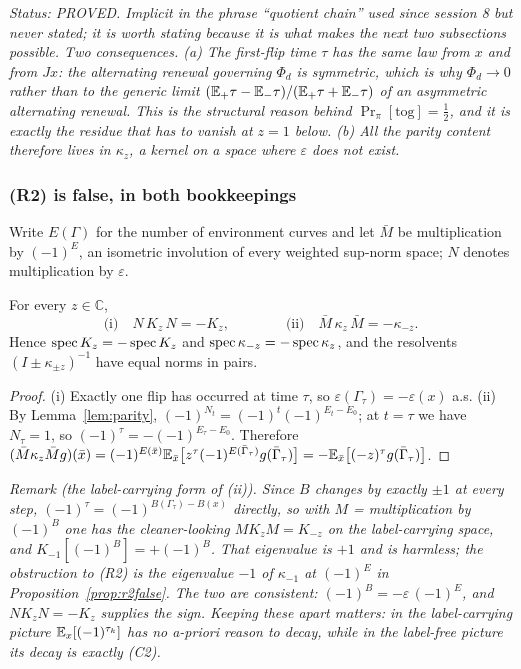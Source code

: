 \emph{Status: PROVED.  Implicit in the phrase ``quotient chain'' used
since session 8 but never stated; it is worth stating because it is
what makes the next two subsections possible.  Two consequences.  (a)
The first-flip time $\tau$ has the same law from $x$ and from $Jx$:
the alternating renewal governing $\Phi_d$ is \emph{symmetric}, which
is why $\Phi_d\to0$ rather than to the generic limit
$(\mathbb{E}_+\tau-\mathbb{E}_-\tau)/(\mathbb{E}_+\tau+\mathbb{E}_-\tau)$ of an asymmetric alternating
renewal.  This is the structural reason behind
$\Pr_\pi[\mathrm{tog}]=\tfrac12$, and it is exactly the residue that
has to vanish at $z=1$ below.  (b) All the parity content therefore
lives in $\kappa_z$, a kernel on a space where $\varepsilon$ does not
exist.}

\subsubsection{(R2) is false, in both bookkeepings}\label{sec:s11false}

Write $E(\Gamma)$ for the number of environment curves and let $\bar M$
be multiplication by $(-1)^{E}$, an isometric involution of every
weighted sup-norm space; $N$ denotes multiplication by $\varepsilon$.

\begin{lemma}\label{lem:conj}
For every $z\in\mathbb C$,
\[
\text{(i)}\quad N\,K_z\,N=-K_z,
\qquad\qquad
\text{(ii)}\quad \bar M\,\kappa_z\,\bar M=-\kappa_{-z} .
\]
Hence $\operatorname{spec} K_z=-\operatorname{spec} K_z$ and $\operatorname{spec}\kappa_{-z}=-\operatorname{spec}\kappa_z$, and
the resolvents $(I\pm\kappa_{\pm z})^{-1}$ have equal norms in pairs.
\end{lemma}

\begin{proof}
(i) Exactly one flip has occurred at time $\tau$, so
$\varepsilon(\Gamma_\tau)=-\varepsilon(x)$ a.s.
(ii) By Lemma~\ref{lem:parity}, $(-1)^{N_t}=(-1)^t(-1)^{E_t-E_0}$; at
$t=\tau$ we have $N_\tau=1$, so $(-1)^\tau=-(-1)^{E_\tau-E_0}$.
Therefore
$(\bar M\kappa_z\bar Mg)(\bar x)=(-1)^{E(\bar x)}
\mathbb{E}_{\bar x}\bigl[z^\tau(-1)^{E(\bar\Gamma_\tau)}g(\bar\Gamma_\tau)\bigr]
=-\mathbb{E}_{\bar x}\bigl[(-z)^\tau g(\bar\Gamma_\tau)\bigr]$.
\end{proof}

\emph{Remark (the label-carrying form of (ii)).  Since $B$ changes by
exactly $\pm1$ at every step, $(-1)^\tau=(-1)^{B(\Gamma_\tau)-B(x)}$
directly, so with $M$ = multiplication by $(-1)^{B}$ one has the
cleaner-looking $M K_zM=K_{-z}$ on the label-carrying space, and
$K_{-1}[(-1)^B]=+(-1)^B$.  That eigenvalue is $+1$ and is harmless;
the obstruction to (R2) is the eigenvalue $-1$ of
$\kappa_{-1}$ at $(-1)^E$ in Proposition~\ref{prop:r2false}.  The two
are consistent: $(-1)^B=-\varepsilon\,(-1)^E$, and
$N K_zN=-K_z$ supplies the sign.  Keeping these apart matters: in the
label-carrying picture $\mathbb{E}_x[(-1)^{\tau_k}]$ has no a-priori reason to
decay, while in the label-free picture its decay is exactly (C2).}

